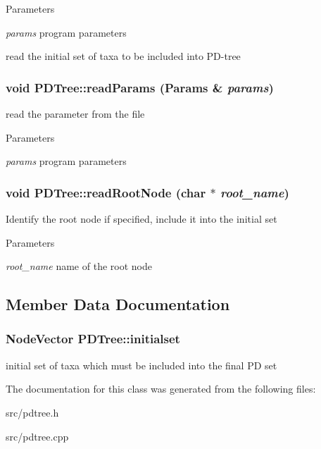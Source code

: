 \begin{DoxyParams}{Parameters}
\item[{\em params}]program parameters\end{DoxyParams}
read the initial set of taxa to be included into PD-\/tree \hypertarget{classPDTree_a912f332d0f5b13f4bc6820196af53875}{
\subsubsection[{readParams}]{\setlength{\rightskip}{0pt plus 5cm}void PDTree::readParams ({\bf Params} \& {\em params})}}
\label{classPDTree_a912f332d0f5b13f4bc6820196af53875}
read the parameter from the file 
\begin{DoxyParams}{Parameters}
\item[{\em params}]program parameters \end{DoxyParams}
\hypertarget{classPDTree_a5153f2fadfa0f9a60e1289127afa31b3}{
\subsubsection[{readRootNode}]{\setlength{\rightskip}{0pt plus 5cm}void PDTree::readRootNode (char $\ast$ {\em root\_\-name})}}
\label{classPDTree_a5153f2fadfa0f9a60e1289127afa31b3}
Identify the root node if specified, include it into the initial set 
\begin{DoxyParams}{Parameters}
\item[{\em root\_\-name}]name of the root node \end{DoxyParams}


\subsection{Member Data Documentation}
\hypertarget{classPDTree_aeb8c8f4c842f30b7a0d70b32546e7af1}{
\subsubsection[{initialset}]{\setlength{\rightskip}{0pt plus 5cm}NodeVector {\bf PDTree::initialset}}}
\label{classPDTree_aeb8c8f4c842f30b7a0d70b32546e7af1}
initial set of taxa which must be included into the final PD set 

The documentation for this class was generated from the following files:\begin{DoxyCompactItemize}
\item 
src/pdtree.h\item 
src/pdtree.cpp\end{DoxyCompactItemize}
